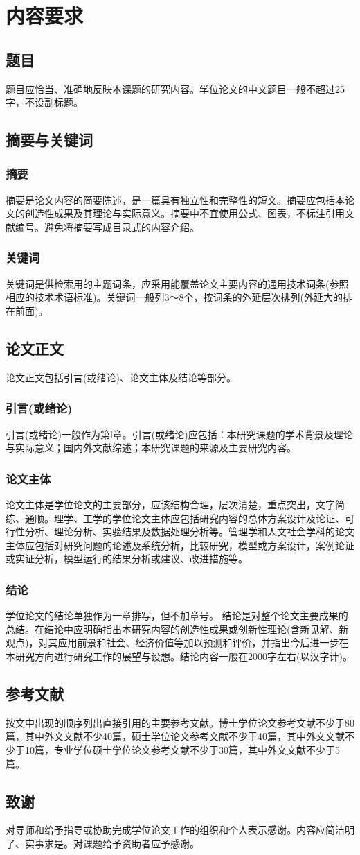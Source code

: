 
\chapter{内容要求}
\section{题目}
题目应恰当、准确地反映本课题的研究内容。学位论文的中文题目一般不超过25字，不设副标题。
\section{摘要与关键词}
\subsection{摘要}
摘要是论文内容的简要陈述，是一篇具有独立性和完整性的短文。摘要应包括本论文的创造性成果及其理论与实际意义。摘要中不宜使用公式、图表，不标注引用文献编号。避免将摘要写成目录式的内容介绍。
\subsection{关键词}
关键词是供检索用的主题词条，应采用能覆盖论文主要内容的通用技术词条(参照相应的技术术语标准)。关键词一般列3～8个，按词条的外延层次排列(外延大的排在前面)。
\section{论文正文}
论文正文包括引言(或绪论)、论文主体及结论等部分。
\subsection{引言(或绪论)}
引言(或绪论)一般作为第l章。引言(或绪论)应包括：本研究课题的学术背景及理论与实际意义；国内外文献综述；本研究课题的来源及主要研究内容。
\subsection{论文主体}
论文主体是学位论文的主要部分，应该结构合理，层次清楚，重点突出，文字简练、通顺。理学、工学的学位论文主体应包括研究内容的总体方案设计及论证、可行性分析、理论分析、实验结果及数据处理分析等。管理学和人文社会学科的论文主体应包括对研究问题的论述及系统分析，比较研究，模型或方案设计，案例论证或实证分析，模型运行的结果分析或建议、改进措施等。
\subsection{结论}
学位论文的结论单独作为一章排写，但不加章号。
结论是对整个论文主要成果的总结。在结论中应明确指出本研究内容的创造性成果或创新性理论(含新见解、新观点)，对其应用前景和社会、经济价值等加以预测和评价，并指出今后进一步在本研究方向进行研究工作的展望与设想。结论内容一般在2000字左右(以汉字计)。
\section{参考文献}
按文中出现的顺序列出直接引用的主要参考文献。博士学位论文参考文献不少于80篇，其中外文文献不少40篇，硕士学位论文参考文献不少于40篇，其中外文文献不少于10篇，专业学位硕士学位论文参考文献不少于30篇，其中外文文献不少于5篇。
\section{致谢}
对导师和给予指导或协助完成学位论文工作的组织和个人表示感谢。内容应简洁明了、实事求是。对课题给予资助者应予感谢。

